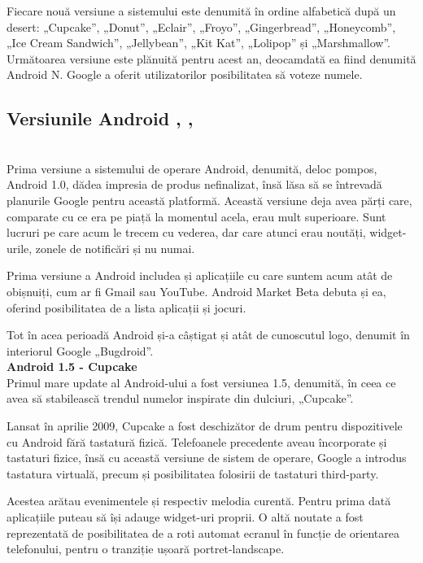 \documentclass[12pt,a4paper]{article}
\begin{document}
Fiecare nouă versiune a sistemului este denumită în ordine alfabetică după un desert: „Cupcake”, „Donut”, „Eclair”, „Froyo”, „Gingerbread”, „Honeycomb”, „Ice Cream Sandwich”, „Jellybean”, „Kit Kat”, „Lolipop” și „Marshmallow”. Următoarea versiune este plănuită pentru acest an, deocamdată ea fiind denumită Android N. Google a oferit utilizatorilor posibilitatea să voteze numele.


\newpage
\subsection{Versiunile Android \cite{AndroidVersionsHistory}, \cite{AndroidHistory}, \cite{DeveloperAndroid}}
\\
Prima versiune a sistemului de operare Android, denumită, deloc pompos, Android 1.0, dădea impresia de produs nefinalizat, însă lăsa să se întrevadă planurile Google pentru această platformă. Această versiune deja avea părți care, comparate cu ce era  pe piață la momentul acela, erau mult superioare. Sunt lucruri pe care acum le trecem cu vederea, dar care atunci erau noutăți, widget-urile, zonele de notificări și nu numai. 

Prima versiune a Android includea și aplicațiile cu care suntem acum atât de obișnuiți, cum ar fi Gmail sau YouTube. Android Market Beta debuta și ea, oferind posibilitatea de a lista aplicații și jocuri.

Tot în acea perioadă Android și-a câștigat și atât de cunoscutul logo, denumit în interiorul Google „Bugdroid”.\\

\textbf{Android 1.5 - Cupcake}\\
Primul mare update al Android-ului a fost versiunea 1.5, denumită, în ceea ce avea să stabilească trendul numelor inspirate din dulciuri, „Cupcake”.

	Lansat în aprilie 2009, Cupcake a fost deschizător de drum pentru dispozitivele cu Android fără tastatură fizică. Telefoanele precedente aveau încorporate și tastaturi fizice, însă cu această versiune de sistem de operare, Google a introdus tastatura virtuală, precum și posibilitatea folosirii de tastaturi third-party.

	Acestea arătau evenimentele și respectiv melodia curentă. Pentru prima dată aplicațiile puteau să își adauge widget-uri proprii. O altă noutate a fost reprezentată de posibilitatea de a roti automat ecranul în funcție de orientarea telefonului, pentru o tranziție ușoară portret-landscape.\\
\end{document}
